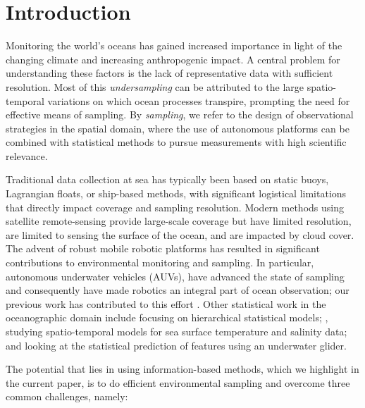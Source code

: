 \documentclass[aoas]{imsart}
\begin{document}
\section{Introduction}

Monitoring the world's oceans has gained increased importance in 
light of the changing climate and increasing anthropogenic impact. A
central problem for understanding these factors is the lack of
representative data with sufficient resolution. Most of this
\emph{undersampling} can be attributed to the large spatio-temporal
variations on which ocean processes transpire, prompting the need for
effective means of sampling. By \emph{sampling}, we refer to the design
of observational strategies in the spatial domain, where the use of
autonomous platforms can be combined with statistical methods to pursue
measurements with high scientific relevance.

Traditional data collection at sea has typically been based on static
buoys, Lagrangian floats, or ship-based methods, with significant
logistical limitations that directly impact coverage and sampling
resolution. Modern methods using satellite remote-sensing provide
large-scale coverage but have limited resolution, are limited to
sensing the surface of the ocean, and are impacted by cloud cover. The
advent of robust mobile robotic platforms \citep{Bellingham07} has
resulted in significant contributions to environmental monitoring and
sampling. In particular, autonomous underwater vehicles (AUVs), have advanced the state of sampling and consequently have made
robotics an integral part of ocean observation; our previous work
has contributed to this effort
\citep{das11b,Das2015,fossum18b,fossuminformation}.
Other statistical work in the oceanographic domain include \cite{wikle2013modern} focusing
on hierarchical statistical models; \cite{sahu2008space}, studying
spatio-temporal models for sea surface temperature and salinity data;
and \cite{mellucci2018oceanic} looking at the statistical prediction
of features using an underwater glider. 

The potential that lies in using information-based methods, which we highlight in the current paper, is to do efficient environmental sampling and overcome three common challenges, namely:
\end{document}
